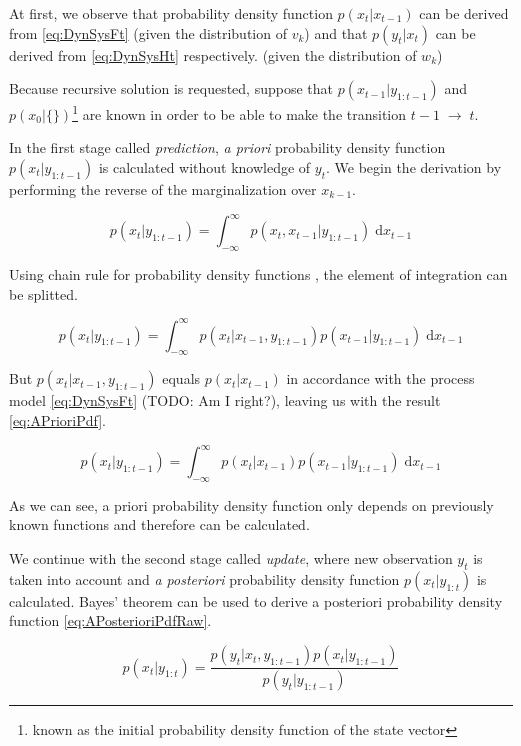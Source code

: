 \documentclass[a4paper,12pt,oneside]{report}
\newcommand{\pdf}{probability density function }
\newcommand{\pdfs}{probability density functions }
\begin{document}
At first, we observe that \pdf \(p(x_t|x_{t-1})\) can be derived from
\eqref{eq:DynSysFt} (given the distribution of \(v_k\)) and that \(p(y_t|x_t)\) can be derived from
\eqref{eq:DynSysHt} respectively. (given the distribution of \(w_k\))

Because recursive solution is requested, suppose that \(p(x_{t-1}|y_{1:t-1})\) and
\(p(x_0 | \{\})\)\footnote{known as the initial \pdf of the state vector} are known in order to be
able to make the transition \(t-1 \; \rightarrow \; t\).

In the first stage called \emph{prediction}, \emph{a priori} \pdf
\(p(x_t | y_{1:t-1})\) is calculated without knowledge of \(y_t\). We begin the derivation by
performing the reverse of the marginalization over \(x_{k-1}\).

\begin{equation*}
	p(x_t | y_{1:t-1}) = \int_{-\infty}^{\infty} p(x_t, x_{t-1} | y_{1:t-1}) \; \mathrm{d} x_{t-1}
\end{equation*}

Using chain rule for \pdfs, the element of integration can be splitted.

\begin{equation*}
	p(x_t | y_{1:t-1}) = \int_{-\infty}^{\infty} p(x_t | x_{t-1}, y_{1:t-1}) p(x_{t-1} | y_{1:t-1}) \; \mathrm{d} x_{t-1}
\end{equation*}

But \(p(x_t | x_{t-1}, y_{1:t-1})\) equals \(p(x_t | x_{t-1})\) in accordance with the process model
\eqref{eq:DynSysFt} (TODO: Am I right?), leaving us with the result \eqref{eq:APrioriPdf}.

\begin{equation} \label{eq:APrioriPdf}
	p(x_t | y_{1:t-1}) = \int_{-\infty}^{\infty} p(x_t | x_{t-1}) p(x_{t-1} | y_{1:t-1}) \; \mathrm{d} x_{t-1}
\end{equation}

As we can see, a priori \pdf only depends on previously known functions and therefore can be
calculated.

We continue with the second stage called \emph{update}, where new observation \(y_t\) is taken into
account and \emph{a posteriori} \pdf \(p(x_t | y_{1:t})\) is calculated. Bayes' theorem can be used
to derive a posteriori \pdf \eqref{eq:APosterioriPdfRaw}.

\begin{equation} \label{eq:APosterioriPdfRaw}
	p(x_t | y_{1:t}) = \frac{p(y_t | x_t, y_{1:t-1}) p(x_t | y_{1:t-1})}{p(y_t | y_{1:t-1})}
\end{equation}
\end{document}
